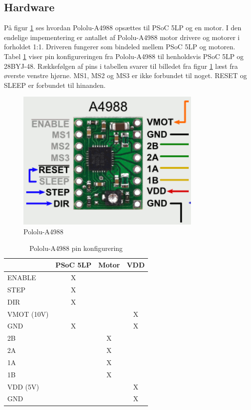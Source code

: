 \subsection{Hardware}
\label{HW_Implementering}
På figur \ref{fig:Pololu-A4988} ses hvordan Pololu-A4988 opsættes til PSoC 5LP og en motor. I den endelige impementering er antallet af Pololu-A4988 motor drivere og motorer i forholdet 1:1. Driveren fungerer som bindeled mellem PSoC 5LP og motoren. Tabel \ref{tab:Pololu-A4988_pin_configuration} viser pin konfigureringen fra Pololu-A4988 til henholdsvis PSoC 5LP og 28BYJ-48. Rækkefølgen af pins i tabellen svarer til billedet fra figur \ref{fig:Pololu-A4988} læst fra øverste venstre hjørne. MS1, MS2 og MS3 er ikke forbundet til noget. RESET og SLEEP er forbundet til hinanden.

\begin{figure}[H]
	\centerline{\includegraphics[scale=0.6]{tex/Implementering/Implementering_til_projektrapport/Pololu-A4988.png}}
	\caption[]{Pololu-A4988}\footnotemark
	\label{fig:Pololu-A4988}
\end{figure}

\begin{table}[H]
  \centering
\begin{tabular}{ |l|c|c|c| }
  \hline
   & \textbf{PSoC 5LP} & \textbf{Motor} & \textbf{VDD} \\
  \hline 
  ENABLE & X & & \\
  \hline
  STEP & X & & \\
  \hline
  DIR & X & & \\
  \hline
  VMOT (10V) & & & X \\
  \hline
  GND & X & & X \\
  \hline
  2B & & X & \\
  \hline
  2A & & X & \\
  \hline
  1A & & X & \\
  \hline
  1B & & X & \\
  \hline
  VDD (5V) & & & X \\
  \hline
  GND & & & X \\
  \hline
\end{tabular}
\caption{Pololu-A4988 pin konfigurering}\label{tab:Pololu-A4988_pin_configuration}
\end{table}


